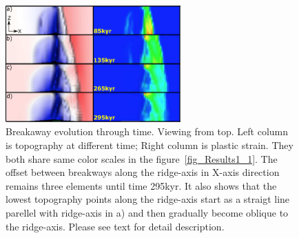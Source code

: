 \begin{figure}[hc]
  \centering
    \includegraphics[width=0.6\textwidth]{fig_Results1_4.eps}
  \caption{Breakaway evolution through time. Viewing from top. Left column is topography at different time; Right column is plastic strain. They both share same color scales in the figure~\ref{fig_Results1_1}. The offset between breakways along the ridge-axis in X-axis direction remains three elements until time 295kyr. It also shows that the lowest topography points along the ridge-axis start as a straigt line parellel with ridge-axis in a) and then gradually become oblique to the ridge-axis. Please see text for detail description.}
 \label{fig_Results1_4}
\end{figure}

